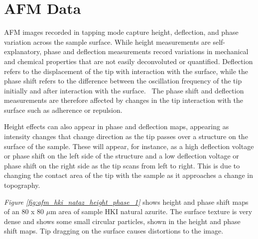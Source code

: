 



\section[AFM Data]{AFM Data}
\label{section3.4}


AFM images recorded in tapping mode capture height, deflection, and phase variation across the sample surface. While height measurements are self-explanatory, phase and deflection measurements record variations in mechanical and chemical properties that are not easily deconvoluted or quantified. Deflection refers to the displacement of the tip with interaction with the surface, while the phase shift refers to the difference between the oscillation frequency of the tip initially and after interaction with the surface.~\autocite{iscpi} The phase shift and deflection measurements are therefore affected by changes in the tip interaction with the surface such as adherence or repulsion. 

Height effects can also appear in phase and deflection maps, appearing as intensity changes that change direction as the tip passes over a structure on the surface of the sample. These will appear, for instance, as a high deflection voltage or phase shift on the left side of the structure and a low deflection voltage or phase shift on the right side as the tip scans from left to right. This is due to changing the contact area of the tip with the sample as it approaches a change in topography.~\autocite{iscpi} 

\textit{Figure \ref{fig:afm_hki_nataz_height_phase_1}} shows height and phase shift maps of an 80 x 80 $\mu$m area of sample HKI natural azurite. The surface texture is very dense and shows some small circular particles, shown in the height and phase shift maps. Tip dragging on the surface causes distortions to the image. 

